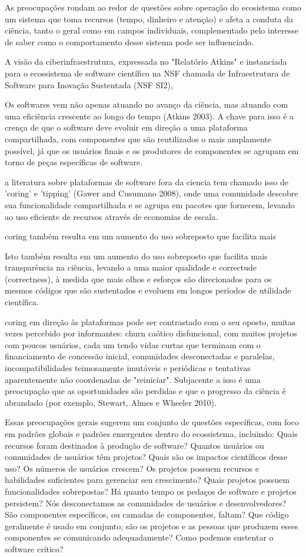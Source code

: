 As preocupações rondam ao redor de questões sobre operação do ecosistema como
um sistema que toma recursos (tempo, dinheiro e atenção) e afeta a conduta da
ciência, tanto o geral como em campos individuais, complementado pelo interesse
de saber como o comportamento desse sistema pode ser influenciado.

A visão da ciberinfraestrutura, expressada no "Relatório Atkins" e instanciada
para o ecossistema de software científico na NSF chamada de Infraestrutura de
Software para Inovação Sustentada (NSF SI2),

Os softwares vem não apenas atuando no avanço da ciência, mas atuando com uma
eficiência crescente ao longo do tempo (Atkins 2003). A chave para isso é a
crença de que o software deve evoluir em direção a uma plataforma
compartilhada, com componentes que são reutilizados o mais amplamente possível,
já que os usuários finais e os produtores de componentes se agrupam em torno de
peças específicas de software.

a literatura sobre plataformas de software fora da ciencia tem chamado isso de
'coring' e 'tipping' (Gawer and Cusumano 2008),
onde uma comunidade descobre sua funcionalidade compartilhada e se agrupa
em pacotes que fornecem, levando ao uso eficiente de recursos através de
economias de escala.

coring também resulta em um aumento do uso sobreposto que facilita mais

Isto também resulta em um aumento do uso sobreposto que facilita mais
transparência na ciência, levando a uma maior qualidade e correctude (correctness), à medida
que mais olhos e esforços são direcionados para os mesmos códigos que são
sustentados e evoluem em longos períodos de utilidade científica.

coring em direção às plataformas pode ser contrastado com o seu oposto, muitas
vezes percebido por informantes: churn caótico disfuncional, com muitos
projetos com poucos usuários, cada um tendo vidas curtas que terminam com o
financiamento de concessão inicial, comunidades desconectadas e paralelas,
incompatibilidades teimosamente imutáveis e periódicas e tentativas
aparentemente não coordenadas de "reiniciar". Subjacente a isso é uma
preocupação que as oportunidades são perdidas e que o progresso da ciência é
abrandado (por exemplo, Stewart, Almes e Wheeler 2010).

Essas preocupações gerais sugerem um conjunto de questões específicas, com foco
em padrões globais e padrões emergentes dentro do ecossistema, incluindo: Quais
recursos foram destinados à produção de software? Quantos usuários ou
comunidades de usuários têm projetos? Quais são os impactos científicos desse
uso? Os números de usuários crescem? Os projetos possuem recursos e habilidades
suficientes para gerenciar seu crescimento? Quais projetos possuem
funcionalidades sobrepostas? Há quanto tempo os pedaços de software e projetos
persistem? Nós desconectamos as comunidades de usuários e desenvolvedores? São
componentes específicos, ou camadas de componentes, faltam? Que código
geralmente é usado em conjunto; são os projetos e as pessoas que produzem esses
componentes se comunicando adequadamente? Como podemos sustentar o software
crítico?

